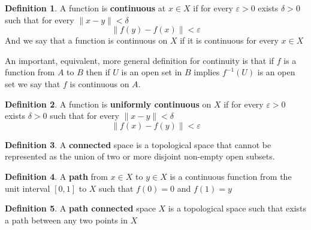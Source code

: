 \documentclass[11pt,a4paper]{article}
\theoremstyle{definition}
\newtheorem{definition}{Definition}[section]
\theoremstyle{plain}
\begin{document}
	\begin{definition}
	A function is \textbf{continuous} at $x\in X$ if for every $\varepsilon > 0$
	exists $\delta > 0$ such that for every $\|x-y\| < \delta$
	\[
		\|f(y) - f(x)\| < \varepsilon
	\]
	And we say that a function is continuous on $X$ if it is continuous
	for every $x\in X$
	\end{definition}
	An important, equivalent, more general definition for continuity is that
	if $f$ is a function from $A$ to $B$ then if $U$ is an open set in $B$
	implies $f^{-1}(U)$ is an open set we say that $f$ is continuous on $A$.
	\begin{definition}
	A function is \textbf{uniformly continuous} on $X$ if for every 
	$\varepsilon > 0$ exists $\delta > 0$ such that for every 
	$\|x-y\| < \delta$
	\[
		\|f(x) - f(y)\| < \varepsilon
	\]
	\end{definition}
	\begin{definition}
	A \textbf{connected} space is a topological space that cannot be 
	represented as the union of two or more disjoint non-empty open subsets. 
	\end{definition}
	\begin{definition}
	A \textbf{path} from $x\in X$ to $y\in X$ is a continuous function from 
	the unit interval $[0,1]$ to $X$ such that $f(0) = 0$ and $f(1) = y$
	\end{definition}
	\begin{definition}
	A \textbf{path connected} space $X$ is a topological space such that 
	exists a path between any two points in $X$
	\end{definition}
	
	\newpage
	
\end{document}
